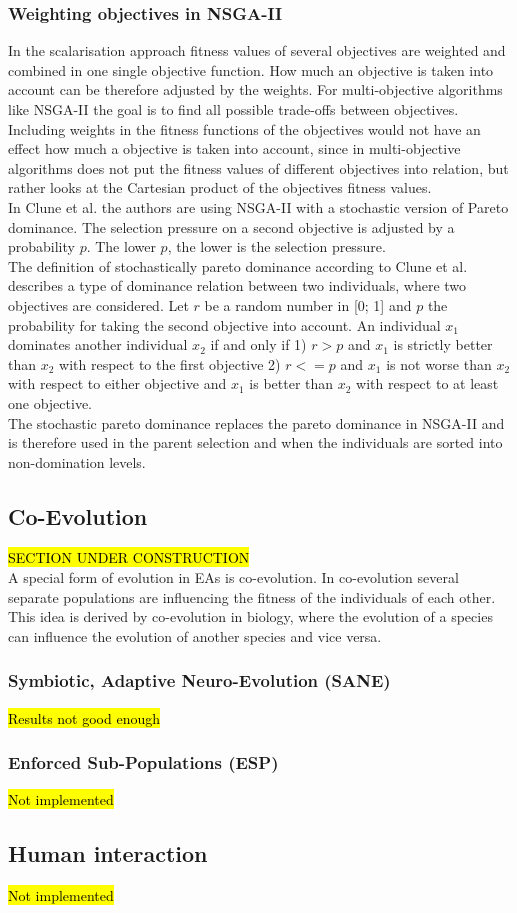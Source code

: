    \subsubsection{Weighting objectives in NSGA-II}
    In the scalarisation approach fitness values of several objectives are weighted and combined in one single objective function. How much an objective is taken into account can be therefore adjusted by the weights. For multi-objective algorithms like NSGA-II the goal is to find all possible trade-offs between objectives. Including weights in the fitness functions of the objectives would not have an effect how much a objective is taken into account, since in multi-objective algorithms does not put the fitness values of different objectives into relation, but rather looks at the Cartesian product of the objectives fitness values.\\
    In Clune et al.\cite{clune2013evolutionary} the authors are using NSGA-II with a stochastic version of Pareto dominance. The selection pressure on a second objective is adjusted by a probability $p$. The lower $p$, the lower is the selection pressure.\\
    The definition of stochastically pareto dominance according to Clune et al.\cite{clune2013evolutionary} describes a type of dominance relation between two individuals, where two objectives are considered. Let $r$ be a random number in [0; 1] and $p$ the probability for taking the second objective into account. An individual $x_1$ dominates another individual $x_2$ if and only if 1) $r>p$ and $x_1$ is strictly better than $x_2$ with respect to the first objective 2) $r<=p$ and $x_1$ is not worse than $x_2$ with respect to either objective and $x_1$ is better than $x_2$ with respect to at least one objective.\\
    The stochastic pareto dominance replaces the pareto dominance in NSGA-II and is therefore used in the parent selection and when the individuals are sorted into non-domination levels.
    
    \subsection{Co-Evolution}
    \hl{SECTION UNDER CONSTRUCTION}\\
    A special form of evolution in EAs is co-evolution. In co-evolution several separate populations are influencing the fitness of the individuals of each other. This idea is derived by co-evolution in biology, where the evolution of a species can influence the evolution of another species and vice versa.
    
    \subsubsection{Symbiotic, Adaptive Neuro-Evolution (SANE)}
    \hl{Results not good enough}
    
    \subsubsection{Enforced Sub-Populations (ESP)}
    \hl{Not implemented}
    
    \subsection{Human interaction}
    \hl{Not implemented}